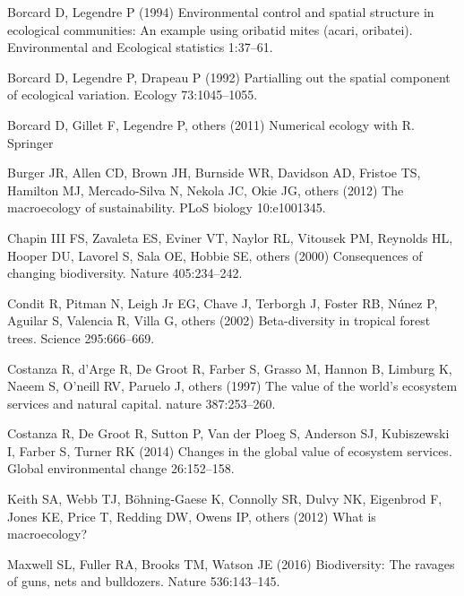 \documentclass[
  10pt,
]{book}
\newlength{\cslhangindent}
\newenvironment{CSLReferences}[2] %
 {\begin{list}{}{%
  \setlength{\itemindent}{0pt}
  \setlength{\leftmargin}{0pt}
  \setlength{\parsep}{0pt}
  \ifodd #1
   \setlength{\leftmargin}{\cslhangindent}
   \setlength{\itemindent}{-1\cslhangindent}
  \fi
  \setlength{\itemsep}{#2\baselineskip}}}
 {\end{list}}
\begin{document}
\label{refs}
\begin{CSLReferences}{1}{1}
Borcard D, Legendre P (1994) Environmental control and spatial structure
in ecological communities: An example using oribatid mites (acari,
oribatei). Environmental and Ecological statistics 1:37--61.

Borcard D, Legendre P, Drapeau P (1992) Partialling out the spatial
component of ecological variation. Ecology 73:1045--1055.

Borcard D, Gillet F, Legendre P, others (2011) Numerical ecology with
{R}. Springer

Burger JR, Allen CD, Brown JH, Burnside WR, Davidson AD, Fristoe TS,
Hamilton MJ, Mercado-Silva N, Nekola JC, Okie JG, others (2012) The
macroecology of sustainability. PLoS biology 10:e1001345.

Chapin III FS, Zavaleta ES, Eviner VT, Naylor RL, Vitousek PM, Reynolds
HL, Hooper DU, Lavorel S, Sala OE, Hobbie SE, others (2000) Consequences
of changing biodiversity. Nature 405:234--242.

Condit R, Pitman N, Leigh Jr EG, Chave J, Terborgh J, Foster RB, Núnez
P, Aguilar S, Valencia R, Villa G, others (2002) Beta-diversity in
tropical forest trees. Science 295:666--669.

Costanza R, d'Arge R, De Groot R, Farber S, Grasso M, Hannon B, Limburg
K, Naeem S, O'neill RV, Paruelo J, others (1997) The value of the
world's ecosystem services and natural capital. nature 387:253--260.

Costanza R, De Groot R, Sutton P, Van der Ploeg S, Anderson SJ,
Kubiszewski I, Farber S, Turner RK (2014) Changes in the global value of
ecosystem services. Global environmental change 26:152--158.

Keith SA, Webb TJ, Böhning-Gaese K, Connolly SR, Dulvy NK, Eigenbrod F,
Jones KE, Price T, Redding DW, Owens IP, others (2012) What is
macroecology?

Maxwell SL, Fuller RA, Brooks TM, Watson JE (2016) Biodiversity: The
ravages of guns, nets and bulldozers. Nature 536:143--145.


\end{CSLReferences}
\end{document}
